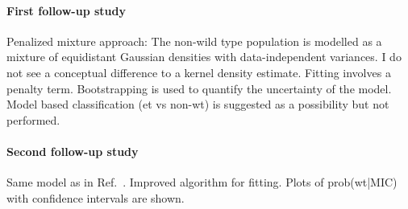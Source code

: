 \documentclass[a4paper]{article}
\begin{document}
\paragraph{First follow-up study \cite{Jaspers2014b}} Penalized mixture approach: The non-wild type population is modelled as a mixture of equidistant Gaussian densities with data-independent variances. I do not see a conceptual difference to a kernel density estimate. Fitting involves a penalty term. Bootstrapping is used to quantify the uncertainty of the model. Model based classification (et vs non-wt) is suggested as a possibility but not performed.
\paragraph{Second follow-up study \cite{Jaspers2016}} Same model as in Ref.\ \cite{Jaspers2014b}. Improved algorithm for fitting. Plots of prob(wt|MIC) with confidence intervals are shown.




\end{document}
